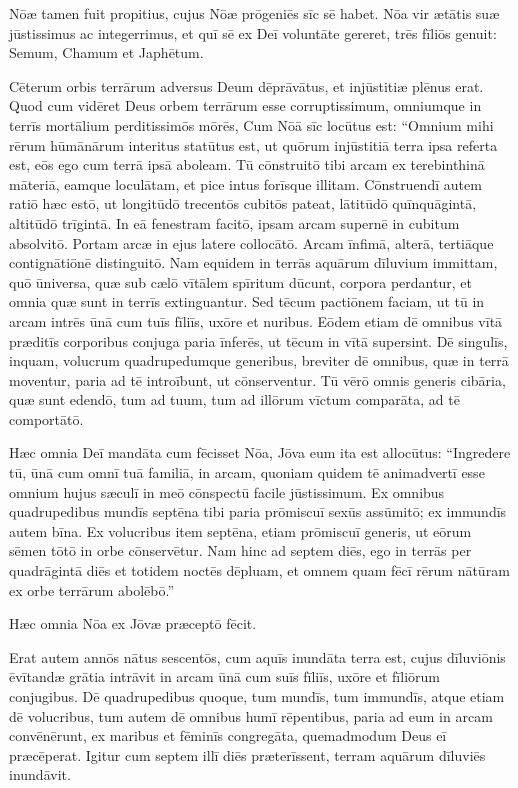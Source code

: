 \Versus Nōæ tamen fuit propitius,
\Versus cujus Nōæ prōgeniēs sīc sē habet. Nōa vir ætātis suæ jūstissimus ac integerrimus, et quī sē ex Deī voluntāte gereret,
\Versus trēs fīliōs genuit: Semum, Chamum et Japhētum.

\Versus Cēterum orbis terrārum adversus Deum dēprāvātus, et injūstitiæ plēnus erat.
\Versus Quod cum vidēret Deus orbem terrārum esse corruptissimum, omniumque in terrīs mortālium perditissimōs mōrēs,
\Versus Cum Nōā sīc locūtus est: ``Omnium mihi rērum hūmānārum interitus statūtus est, ut quōrum injūstitiā terra ipsa referta est, eōs ego cum terrā ipsā aboleam.
\Versus Tū cōnstruitō tibi arcam ex terebinthinā māteriā, eamque loculātam, et pice intus forīsque illitam.
\Versus Cōnstruendī autem ratiō hæc estō, ut longitūdō trecentōs cubitōs pateat, lātitūdō quīnquāgintā, altitūdō trīgintā.
\Versus In eā fenestram facitō, ipsam arcam supernē in cubitum absolvitō. Portam arcæ in ejus latere collocātō. Arcam īnfimā, alterā, tertiāque contignātiōnē distinguitō.
\Versus Nam equidem in terrās aquārum dīluvium immittam, quō ūniversa, quæ sub cælō vītālem spīritum dūcunt, corpora perdantur, et omnia quæ sunt in terrīs extinguantur.
\Versus Sed tēcum pactiōnem faciam, ut tū in arcam intrēs ūnā cum tuīs fīliīs, uxōre et nuribus.
\Versus Eōdem etiam dē omnibus vītā præditīs corporibus conjuga paria īnferēs, ut tēcum in vītā supersint.
\Versus Dē singulīs, inquam, volucrum quadrupedumque generibus, breviter dē omnibus, quæ in terrā moventur, paria ad tē introībunt, ut cōnserventur.
\Versus Tū vērō omnis generis cibāria, quæ sunt edendō, tum ad tuum, tum ad illōrum vīctum comparāta, ad tē comportātō.



\Caput
\Versus Hæc omnia Deī mandāta cum fēcisset Nōa, Jōva eum ita est allocūtus: ``Ingredere tū, ūnā cum omnī tuā familiā, in arcam, quoniam quidem tē animadvertī esse omnium hujus sæculī in meō cōnspectū facile jūstissimum.
\Versus Ex omnibus quadrupedibus mundīs septēna tibi paria prōmiscuī sexūs assūmitō; ex immundīs autem bīna.
\Versus Ex volucribus item septēna, etiam prōmiscuī generis, ut eōrum sēmen tōtō in orbe cōnservētur.
\Versus Nam hinc ad septem diēs, ego in terrās per quadrāgintā diēs et totidem noctēs dēpluam, et omnem quam fēcī rērum nātūram ex orbe terrārum abolēbō.''

\Versus Hæc omnia Nōa ex Jōvæ præceptō fēcit.

\Versus Erat autem annōs nātus sescentōs, cum aquīs inundāta terra est,
\Versus cujus dīluviōnis ēvītandæ grātia intrāvit in arcam ūnā cum suīs fīliīs, uxōre et fīliōrum conjugibus.
\Versus Dē quadrupedibus quoque, tum mundīs, tum immundīs, atque etiam dē volucribus, tum autem dē omnibus humī rēpentibus,
\Versus paria ad eum in arcam convēnērunt, ex maribus et fēminīs congregāta, quemadmodum Deus eī præcēperat.
\Versus Igitur cum septem illī diēs præterīssent, terram aquārum dīluviēs inundāvit.

